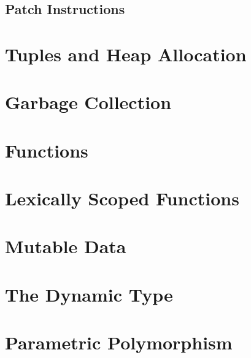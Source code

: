 \documentclass[12pt]{book}
\begin{document}
\section{Patch Instructions}


\chapter{Tuples and Heap Allocation}
\label{ch:tuples}

\chapter{Garbage Collection}
\label{ch:gc}


\chapter{Functions}
\label{ch:functions}


\chapter{Lexically Scoped Functions}
\label{ch:lambdas}


\chapter{Mutable Data}
\label{ch:mutable-data}

\chapter{The Dynamic Type}
\label{ch:type-dynamic}


\chapter{Parametric Polymorphism}
\label{ch:parametric-polymorphism}

\end{document}

